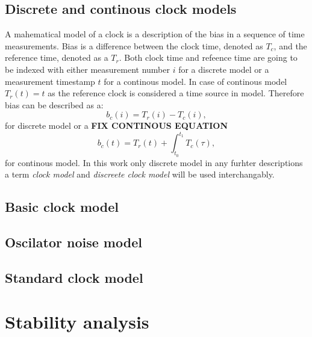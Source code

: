\subsection{Discrete and continous clock models}
A mahematical model of a clock is a description of the bias in a sequence of time measurements.
Bias is a difference between the clock time, denoted as $T_{c}$, and the reference time,
denoted as a $T_{r}$. Both clock time and refeence time are going to be indexed with either
measurement number $i$ for a discrete model or a measurement timestamp  $t$ for a continous 
model. In case of continous model $T_{r}(t)=t$ as the reference clock is considered a
time source in model. Therefore bias can be described as a:
\begin{equation}
	b_{c}(i) = T_{r}(i) - T_{c}(i),
\end{equation}
for discrete model or a \textbf{FIX CONTINOUS EQUATION}
\begin{equation}
	b_{c}(t) = T_{r}(t) + \int_{t_0}^{t_1}T_{c}(\tau),
\end{equation}
for continous model.
In this work only discrete model in any furhter descriptions a term \emph{clock model} and
\emph{discreete clock model} will be used interchangably.



\subsection{Basic clock model}

\subsection{Oscilator noise model}

\subsection{Standard clock model}


\section{Stability analysis}

